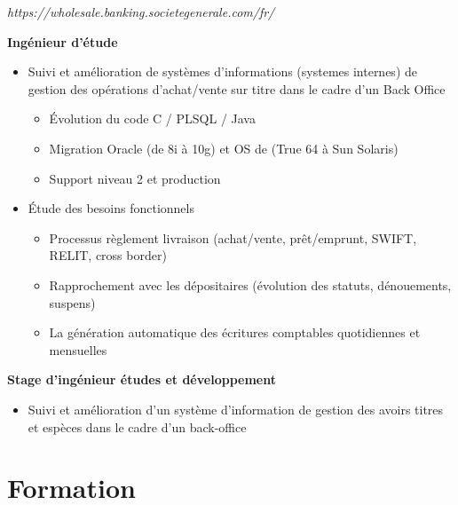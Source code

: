 \documentclass[11pt,a4paper]{moderncv}
\begin{document}
\newpage

{
	\textit{https://wholesale.banking.societegenerale.com/fr/}

	\bigskip
	\textbf{Ingénieur d'étude}
\bigskip
\begin{itemize}
\item Suivi et amélioration de systèmes d'informations (systemes internes) de gestion des opérations d'achat/vente sur titre dans le cadre d'un Back Office
	\begin{itemize}
		\item Évolution du code C / PLSQL / Java
		\item Migration Oracle (de 8i à 10g) et OS de (True 64 à Sun Solaris)
		\item Support niveau 2 et production
\end{itemize}
\bigskip
\item Étude des besoins fonctionnels
	\begin{itemize}
		\item Processus règlement livraison (achat/vente, prêt/emprunt, SWIFT, RELIT, cross border)
		\item Rapprochement avec les dépositaires (évolution des statuts, dénouements, suspens)
		\item La génération automatique des écritures comptables quotidiennes et mensuelles
	\end{itemize}
\end{itemize}
}
\bigskip
{}
{
\bigskip
\textbf{Stage d'ingénieur études et développement}
\bigskip
\begin{itemize}
	\item Suivi et amélioration d'un système d'information de gestion des avoirs titres et espèces dans le cadre d'un back-office
\end{itemize}
}
\section{Formation}


\end{document}
